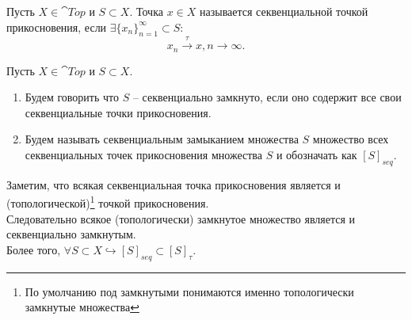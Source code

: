 \begin{definition}
    Пусть $X \in \cat{Top}$ и $S \subset X$.
    Точка $x \in X$ называется секвенциальной точкой прикосновения, если $\exists \{x_n\}_{n = 1}^{\infty} \subset S\colon$
    \[
        x_n \xrightarrow{\tau} x, n \rightarrow \infty.
    \]
\end{definition}
\begin{definition}
    Пусть $X \in \cat{Top}$ и $S \subset X$.
    \begin{enumerate}
        \item Будем говорить что $S$ -- секвенциально замкнуто, если оно содержит все свои секвенциальные точки прикосновения.
        \item Будем называть секвенциальным замыканием множества $S$ множество всех секвенциальных точек прикосновения множества $S$ и обозначать как $[S]_{seq}$.
    \end{enumerate}
\end{definition}
\begin{note}
    Заметим, что всякая секвенциальная точка прикосновения является и (топологической)\footnote{По умолчанию под замкнутыми понимаются именно топологически замкнутые множества} точкой прикосновения. \\
    Следовательно всякое (топологически) замкнутое множество является и секвенциально замкнутым. \\
    Более того, $\forall S \subset X \hookrightarrow [S]_{seq} \subset [S]_\tau$.
\end{note}
